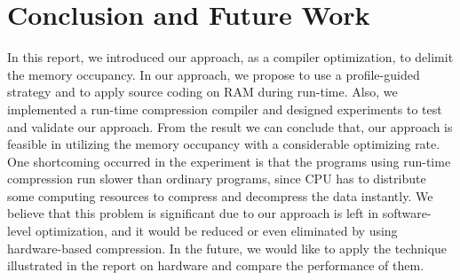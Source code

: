 \documentclass[]{article}
\begin{document}
\section{Conclusion and Future Work}
	In this report, we introduced our approach, as a compiler optimization, to delimit the memory occupancy. In our approach, we propose to use a profile-guided strategy and to apply source coding on RAM during run-time. Also, we implemented a run-time compression compiler and designed experiments to test and validate our approach. From the result we can conclude that, our approach is feasible in utilizing the memory occupancy with a considerable optimizing rate. One shortcoming occurred in the experiment is that the programs using run-time compression run slower than ordinary programs, since CPU has to distribute some computing resources to compress and decompress the data instantly. We believe that this problem is significant due to our approach is left in software-level optimization, and it would be reduced or even eliminated by using hardware-based compression. In the future, we would like to apply the technique illustrated in the report on hardware and compare the performance of them.
\printbibliography
\end{document}
